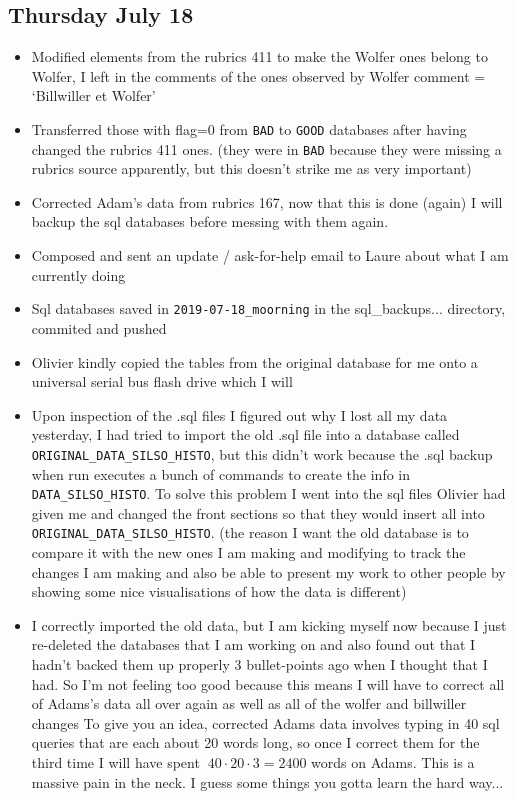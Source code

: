 \documentclass[12pt]{article}
\begin{document}
\subsection{Thursday July 18}
\begin{itemize}
    \item Modified elements from the rubrics 411 to make the Wolfer ones belong to Wolfer, I left in the comments of the ones observed by Wolfer comment = `Billwiller et Wolfer'
    \item Transferred those with flag=0 from \texttt{BAD} to \texttt{GOOD} databases after having changed the rubrics 411 ones. (they were in \texttt{BAD} because they were missing a rubrics source apparently, but this doesn't strike me as very important)
    \item Corrected Adam's data from rubrics 167, now that this is done (again) I will backup the sql databases before messing with them again.
    \item Composed and sent an update / ask-for-help email to Laure about what I am currently doing
    \item Sql databases saved in \texttt{2019-07-18\_moorning} in the sql\_backups... directory, commited and pushed
    \item Olivier kindly copied the tables from the original database for me onto a universal serial bus flash drive which I will 
    \item Upon inspection of the .sql files I figured out why I lost all my data yesterday, I had tried to import the old .sql file into a database called \texttt{ORIGINAL\_DATA\_SILSO\_HISTO}, but this didn't work because the .sql backup when run executes a bunch of commands to create the info in \texttt{DATA\_SILSO\_HISTO}. To solve this problem I went into the sql files Olivier had given me and changed the front sections so that they would insert all into \texttt{ORIGINAL\_DATA\_SILSO\_HISTO}. (the reason I want the old database is to compare it with the new ones I am making and modifying to track the changes I am making and also be able to present my work to other people by showing some nice visualisations of how the data is different)
    \item I correctly imported the old data, but I am kicking myself now because I just re-deleted the databases that I am working on and also found out that I hadn't backed them up properly 3 bullet-points ago when I thought that I had. So I'm not feeling too good because this means I will have to correct all of Adams's data all over again as well as all of the wolfer and billwiller changes To give you an idea, corrected Adams data involves typing in 40 sql queries that are each about 20 words long, so once I correct them for the third time I will have spent $~40\cdot20\cdot3=2400$ words on Adams. This is a massive pain in the neck. I guess some things you gotta learn the hard way...

\end{itemize}
\end{document}
